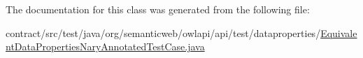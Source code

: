 The documentation for this class was generated from the following file\-:\begin{DoxyCompactItemize}
\item 
contract/src/test/java/org/semanticweb/owlapi/api/test/dataproperties/\hyperlink{_equivalent_data_properties_nary_annotated_test_case_8java}{Equivalent\-Data\-Properties\-Nary\-Annotated\-Test\-Case.\-java}\end{DoxyCompactItemize}
